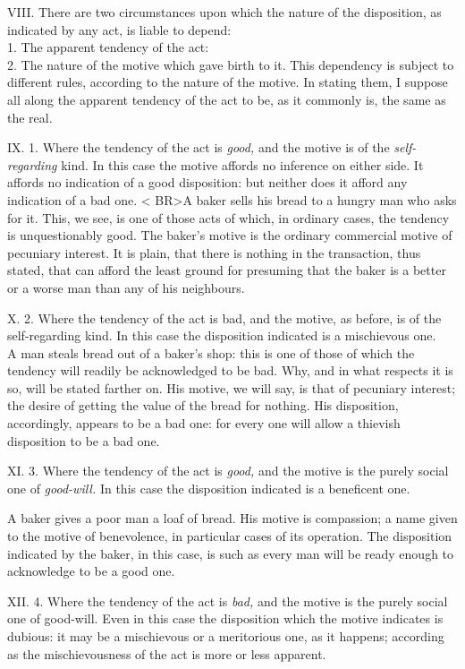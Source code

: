 \documentclass[12pt]{report}
\begin{document}
VIII. There are two circumstances upon which the nature of the
disposition, as indicated by any act, is liable to depend:\\
1. The apparent tendency of the act:\\
2. The nature of the motive which gave birth to it. This dependency is
subject to different rules, according to the nature of the motive. In
stating them, I suppose all along the apparent tendency of the act to
be, as it commonly is, the same as the real.

IX. 1. Where the tendency of the act is \emph{good,} and the motive is
of the \emph{self-regarding} kind. In this case the motive affords no
inference on either side. It affords no indication of a good
disposition: but neither does it afford any indication of a bad one.
\textless{} BR\textgreater{}A baker sells his bread to a hungry man who
asks for it. This, we see, is one of those acts of which, in ordinary
cases, the tendency is unquestionably good. The baker's motive is the
ordinary commercial motive of pecuniary interest. It is plain, that
there is nothing in the transaction, thus stated, that can afford the
least ground for presuming that the baker is a better or a worse man
than any of his neighbours.

X. 2. Where the tendency of the act is bad, and the motive, as before,
is of the self-regarding kind. In this case the disposition indicated is
a mischievous one.\\
A man steals bread out of a baker's shop: this is one of those of which
the tendency will readily be acknowledged to be bad. Why, and in what
respects it is so, will be stated farther on. His motive, we will say,
is that of pecuniary interest; the desire of getting the value of the
bread for nothing. His disposition, accordingly, appears to be a bad
one: for every one will allow a thievish disposition to be a bad one.

XI. 3. Where the tendency of the act is \emph{good,} and the motive is
the purely social one of \emph{good-will.} In this case the disposition
indicated is a beneficent one.

A baker gives a poor man a loaf of bread. His motive is compassion; a
name given to the motive of benevolence, in particular cases of its
operation. The disposition indicated by the baker, in this case, is such
as every man will be ready enough to acknowledge to be a good one.

XII. 4. Where the tendency of the act is \emph{bad,} and the motive is
the purely social one of good-will. Even in this case the disposition
which the motive indicates is dubious: it may be a mischievous or a
meritorious one, as it happens; according as the mischievousness of the
act is more or less apparent.
\end{document}
